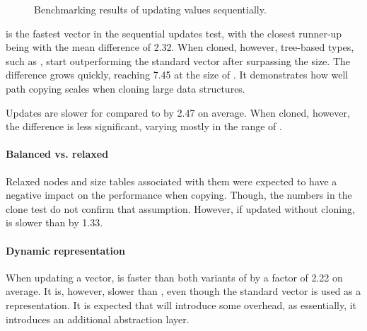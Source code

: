\begin{figure}[!htbp]
    \caption{Benchmarking results of updating values sequentially.}
    \label{fig:update-sequentially}
\end{figure}

\stdvec{} is the fastest vector in the sequential updates test, with the closest runner-up being \pvec{} with the mean difference of 2.32. When cloned, however, tree-based types, such as \rbvec{}, start outperforming the standard vector after surpassing the  size. The difference grows quickly, reaching 7.45 at the size of . It demonstrates how well path copying scales when cloning large data structures.

Updates are slower for \imrsvec{} compared to \rrbvec{} by 2.47 on average. When cloned, however, the difference is less significant, varying mostly in the range of \range{[20, 400]}.

\paragraph{Balanced vs. relaxed}
Relaxed nodes and size tables associated with them were expected to have a negative impact on the performance when copying. Though, the numbers in the clone test do not confirm that assumption. However, if updated without cloning, \rrbvec{} is slower than \rbvec{} by 1.33.

\paragraph{Dynamic representation}
When updating a vector, \pvec{} is faster than both variants of \rbvec{} by a factor of 2.22 on average. It is, however, slower than \stdvec{}, even though the standard vector is used as a representation. It is expected that \pvec{} will introduce some overhead, as essentially, it introduces an additional abstraction layer.

